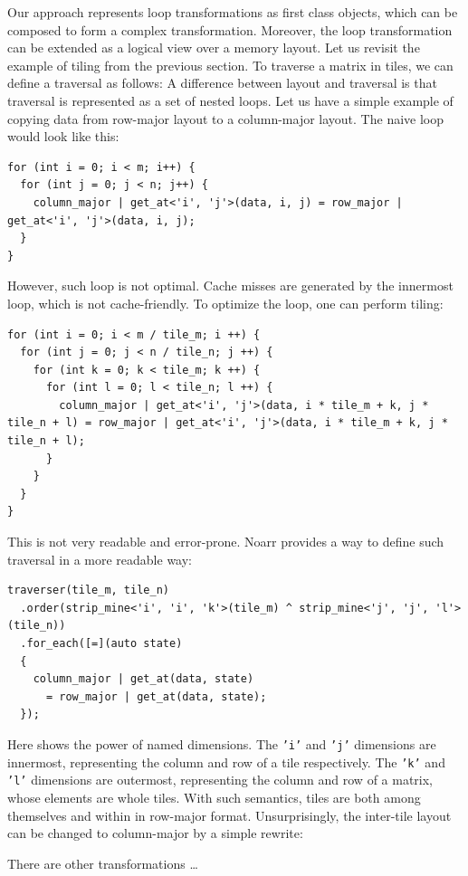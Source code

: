 Our approach represents loop transformations as first class objects, which can be composed to form a complex transformation. Moreover, the loop transformation can be extended as a logical view over a memory layout. Let us revisit the example of tiling from the previous section. To traverse a matrix in tiles, we can define a traversal as follows:
A difference between layout and traversal is that traversal is represented as a set of nested loops. Let us have a simple example of copying data from row-major layout to a column-major layout. The naive loop would look like this: 
\begin{verbatim}
for (int i = 0; i < m; i++) {
  for (int j = 0; j < n; j++) {   
    column_major | get_at<'i', 'j'>(data, i, j) = row_major | get_at<'i', 'j'>(data, i, j);
  }
}
\end{verbatim}
However, such loop is not optimal. Cache misses are generated by the innermost loop, which is not cache-friendly. To optimize the loop, one can perform tiling:
\begin{verbatim}
for (int i = 0; i < m / tile_m; i ++) {
  for (int j = 0; j < n / tile_n; j ++) {
    for (int k = 0; k < tile_m; k ++) {
      for (int l = 0; l < tile_n; l ++) {
        column_major | get_at<'i', 'j'>(data, i * tile_m + k, j * tile_n + l) = row_major | get_at<'i', 'j'>(data, i * tile_m + k, j * tile_n + l);
      }
    }
  }
}
\end{verbatim}
This is not very readable and error-prone. Noarr provides a way to define such traversal in a more readable way:
\begin{verbatim}
traverser(tile_m, tile_n)
  .order(strip_mine<'i', 'i', 'k'>(tile_m) ^ strip_mine<'j', 'j', 'l'>(tile_n))
  .for_each([=](auto state)
  {
    column_major | get_at(data, state) 
      = row_major | get_at(data, state);
  });
\end{verbatim}
Here shows the power of named dimensions. The \texttt{'i'} and \texttt{'j'} dimensions are innermost, representing the column and row of a tile respectively. The \texttt{'k'} and \texttt{'l'} dimensions are outermost, representing the column and row of a matrix, whose elements are whole tiles. With such semantics, tiles are both among themselves and within in row-major format. Unsurprisingly, the inter-tile layout can be changed to column-major by a simple rewrite:

There are other transformations \dots



